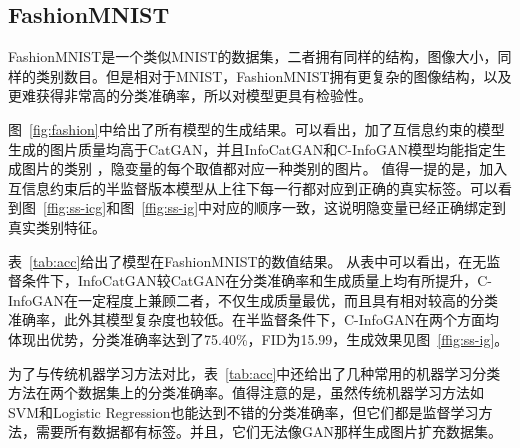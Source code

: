 

\subsection{FashionMNIST}\label{sec:fashion}

FashionMNIST\citep{xiao2017/online}是一个类似MNIST的数据集，二者拥有同样的结构，图像大小，同样的类别数目。但是相对于MNIST，FashionMNIST拥有更复杂的图像结构，以及更难获得非常高的分类准确率，所以对模型更具有检验性。

图~\ref{fig:fashion}中给出了所有模型的生成结果。可以看出，加了互信息约束的模型生成的图片质量均高于CatGAN，并且InfoCatGAN和C-InfoGAN模型均能指定生成图片的类别
，隐变量的每个取值都对应一种类别的图片。
值得一提的是，加入互信息约束后的半监督版本模型从上往下每一行都对应到正确的真实标签。可以看到图~\ref{ffig:ss-icg}和图~\ref{ffig:ss-ig}中对应的顺序一致，这说明隐变量已经正确绑定到真实类别特征。

表~\ref{tab:acc}给出了模型在FashionMNIST的数值结果。
从表中可以看出，在无监督条件下，InfoCatGAN较CatGAN在分类准确率和生成质量上均有所提升，C-InfoGAN在一定程度上兼顾二者，不仅生成质量最优，而且具有相对较高的分类准确率，此外其模型复杂度也较低。在半监督条件下，C-InfoGAN在两个方面均体现出优势，分类准确率达到了75.40\%，FID为15.99，生成效果见图~\ref{ffig:ss-ig}。

为了与传统机器学习方法对比，表~\ref{tab:acc}中还给出了几种常用的机器学习分类方法在两个数据集上的分类准确率。值得注意的是，虽然传统机器学习方法如SVM和Logistic Regression也能达到不错的分类准确率，但它们都是监督学习方法，需要所有数据都有标签。并且，它们无法像GAN那样生成图片扩充数据集。

